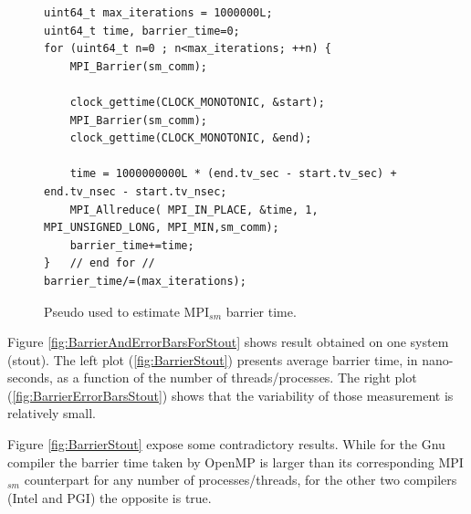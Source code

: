 \begin{figure} [t!]
\centering
\captionsetup{justification=centering, singlelinecheck=false}
\begin{lstlisting}[style=CStyle]
uint64_t max_iterations = 1000000L;
uint64_t time, barrier_time=0;
for (uint64_t n=0 ; n<max_iterations; ++n) {
    MPI_Barrier(sm_comm);
        
    clock_gettime(CLOCK_MONOTONIC, &start);
    MPI_Barrier(sm_comm);    
    clock_gettime(CLOCK_MONOTONIC, &end);
    
    time = 1000000000L * (end.tv_sec - start.tv_sec) + end.tv_nsec - start.tv_nsec;
    MPI_Allreduce( MPI_IN_PLACE, &time, 1, MPI_UNSIGNED_LONG, MPI_MIN,sm_comm);
    barrier_time+=time;
}	// end for //
barrier_time/=(max_iterations);
\end{lstlisting}    
\caption{Pseudo used to estimate MPI$_{sm}$ barrier time.}
\label{fig:PseudoCode3}
\end{figure}


\medskip

Figure \ref{fig:BarrierAndErrorBarsForStout} shows result obtained on one system (stout). The left plot (\ref{fig:BarrierStout}) presents average barrier time, in nano-seconds, as a function of the number of threads/processes. The right plot (\ref{fig:BarrierErrorBarsStout}) shows that the variability of those measurement is relatively small.

\medskip

Figure \ref{fig:BarrierStout} expose some contradictory results. While for the Gnu compiler the barrier time taken by OpenMP is larger than its corresponding MPI$_{sm}$ counterpart for any number of processes/threads, for the other two compilers (Intel and PGI) the opposite is true. 






